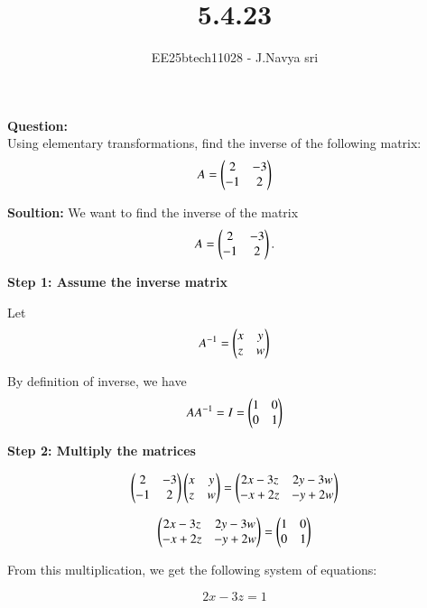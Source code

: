 \documentclass[journal]{IEEEtran}
\begin{document}

\vspace{3cm}

\title{5.4.23}
\author{EE25btech11028 - J.Navya sri}
{\let\newpage\relax\maketitle}


\textbf{Question:} \\
Using elementary transformations, find the inverse of the following matrix:
\[
A = \begin{pmatrix}2 & -3 \\ -1 & 2\end{pmatrix}
\]



\textbf{Soultion:}
We want to find the inverse of the matrix
\[
A = \begin{pmatrix}2 & -3 \\ -1 & 2\end{pmatrix}.
\]

\textbf{Step 1: Assume the inverse matrix}

Let
\begin{equation}
A^{-1} = \begin{pmatrix}x & y \\ z & w\end{pmatrix}
\end{equation}

By definition of inverse, we have
\begin{equation}
A A^{-1} = I = \begin{pmatrix}1 & 0 \\ 0 & 1\end{pmatrix}
\end{equation}

\textbf{Step 2: Multiply the matrices}

\begin{equation}
\begin{pmatrix}2 & -3 \\ -1 & 2\end{pmatrix} \begin{pmatrix}x & y \\ z & w\end{pmatrix} =
\begin{pmatrix}2x - 3z & 2y - 3w \\ -x + 2z & -y + 2w\end{pmatrix}
\end{equation}

\begin{equation}
\begin{pmatrix}2x - 3z & 2y - 3w \\ -x + 2z & -y + 2w\end{pmatrix} = 
\begin{pmatrix}1 & 0 \\ 0 & 1\end{pmatrix}
\end{equation}

From this multiplication, we get the following system of equations:

\begin{equation}
2x - 3z = 1
\end{equation}
\end{document}
